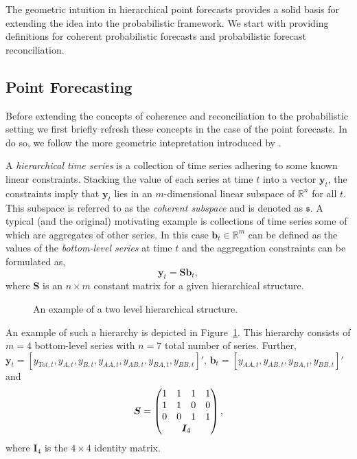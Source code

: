 \documentclass[12pt]{article}
\theoremstyle{definition}
\begin{document}
The geometric intuition in hierarchical point forecasts provides a solid basis for extending the idea into the probabilistic framework. We start with providing definitions for coherent probabilistic forecasts and probabilistic forecast reconciliation.


\subsection{Point Forecasting}\label{sec:Notat&Prelim}

Before extending the concepts of coherence and reconciliation to the probabilistic setting we first briefly refresh these concepts in the case of the point forecasts.  In do so, we
follow the more geometric intepretation introduced by \citep{PanEtAl2019HF}.

A \emph{hierarchical time series} is a collection of time series adhering to some known linear constraints.  Stacking the value of each series at time $t$ into a vector ${\bm y}_t$, the constraints imply that ${\bm y}_t$ lies in an $m$-dimensional linear subspace of $\mathbb{R}^n$ for all $t$.  This subspace is referred to as the {\em coherent subspace} and is denoted as $\mathfrak{s}$.  A typical (and the original) motivating example is collections of time series some of which are aggregates of other series. In this case $\bm{b}_t \in \mathbb{R}^m$ can be defined as the values of the \emph{bottom-level series} at time $t$ and the aggregation constraints can be formulated as,
\begin{equation}\label{eq:coheObservations}
\bm{y}_t = \bm{Sb}_t,
\end{equation}
where $\bm{S}$ is an $n \times m$ constant matrix for a given hierarchical structure.

\begin{figure}[H]
	\begin{center}
		 
		 
		\qobitree
	\end{center}
	\caption{An example of a two level hierarchical structure.}\label{fig:twoL-hier}
\end{figure}

An example of such a hierarchy is depicted in Figure~\ref{fig:twoL-hier}. This hierarchy consists of $m=4$ bottom-level series with $n=7$ total number of series. Further, $\bm{y}_t = [y_{Tot,t},y_{A,t}, y_{B,t},y_{AA,t}, y_{AB,t}, y_{BA,t}, y_{BB,t}]'$, $\bm{b}_t = [y_{AA,t}, y_{AB,t}, y_{BA,t}, y_{BB,t}]'$ and
\[
\bm{S} = \begin{pmatrix}
1 & 1 & 1 & 1 \\
1 & 1 & 0 & 0 \\
0 & 0 & 1 & 1 \\
& \multicolumn{2}{c}{\bm{I}_4} &
\end{pmatrix},
\]
where $\bm{I}_4$ is the $4\times 4$ identity matrix.
\end{document}
